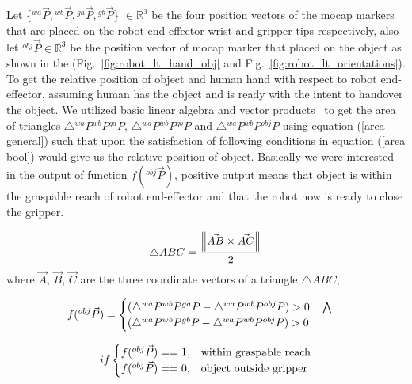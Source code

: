 Let \{${}^{wa}\vec P, {}^{wb}\vec P, {}^{ga}\vec P, {}^{gb}\vec P$\} $\in \mathbb{R}^{3}$ be the four position vectors of the mocap markers that are placed on the robot end-effector wrist and gripper tips respectively, also let ${}^{obj}\vec P\in \mathbb{R}^{3}$ be the position vector of mocap marker that placed on the object as shown in the (Fig.~\ref{fig:robot_lt_hand_obj} and Fig.~\ref{fig:robot_lt_orientations}). To get the relative position of object and human hand with respect to robot end-effector, assuming human has the object and is ready with the intent to handover the object. We utilized basic linear algebra and vector products~\cite{brand1947vector, crowe1994history, artin2016geometric} to get the area of triangles $\triangle{{}^{wa}P {}^{wb}P {}^{ga}P}$, $\triangle{{}^{wa}P {}^{wb}P {}^{gb}P}$ and $\triangle{{}^{wa}P {}^{wb}P {}^{obj}P}$ using equation (\ref{area general}) such that upon the satisfaction of following conditions in equation (\ref{area bool}) would give us the relative position of object. Basically we were interested in the output of function $f({}^{obj}\vec{P})$, positive output means that object is within the graspable reach of robot end-effector and that the robot now is ready to close the gripper.


\begin{equation}\label{area general}
        \triangle{ABC} = \frac{\norm{ \vec{AB} \times \vec{AC} }} {2} \\
\end{equation}
where $\vec{A}$, $\vec{B}$, $\vec{C}$ are the three coordinate vectors of a triangle $\triangle{ABC}$,


\begin{equation}\label{area}
    \centering
    f({}^{obj}\vec{P}) = 
    \begin{cases}
     (\triangle{{}^{wa}P {}^{wb}P {}^{ga}P} - \triangle{{}^{wa}P {}^{wb}P {}^{obj}P}) > 0 \quad \bigwedge \\
     (\triangle{{}^{wa}P {}^{wb}P {}^{gb}P} - \triangle{{}^{wa}P {}^{wb}P {}^{obj}P}) > 0
   \end{cases}         
\end{equation}

\begin{equation}\label{area bool}
    \centering
    if
    \begin{cases}
     f({}^{obj}\vec{P})==1, & \text{within graspable reach}  \\
     f({}^{obj}\vec{P})==0, & \text{object outside gripper}
   \end{cases}         
\end{equation}





